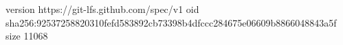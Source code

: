 version https://git-lfs.github.com/spec/v1
oid sha256:92537258820310fefd583892cb73398b4dfccc284675e06609b8866048843a5f
size 11068
